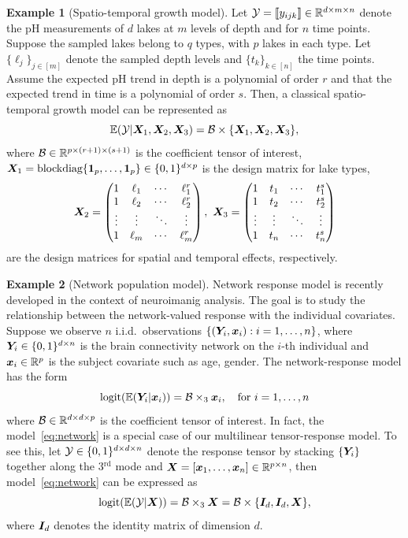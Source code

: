 \documentclass[twoside]{article}
\theoremstyle{plain}
\theoremstyle{definition}
\newtheorem{example}{Example}
\begin{document}
\begin{example}[Spatio-temporal growth model]
Let $\mathcal{Y}=\llbracket y_{ijk} \rrbracket\in\mathbb{R}^{d \times m\times n}$ denote the pH measurements of $d$ lakes at $m$ levels of depth and for $n$ time points. Suppose the sampled lakes belong to $q$ types, with $p$ lakes in each type. Let $\{\ell_j\}_{j\in[m]}$ denote the sampled depth levels and $\{t_k\}_{k\in[n]}$ the time points. Assume the expected pH trend in depth is a polynomial of order $r$ and that the expected trend in time is a polynomial of order $s$. Then, a classical spatio-temporal growth model can be represented as
\[
\mathbb{E}(\mathcal{Y}|\bm X_1,\bm X_2,\bm X_3)=\mathcal{B}\times\{\bm X_1,\bm X_2,\bm X_3\},
\]
where $\mathcal{B}\in\mathbb{R}^{p\times (r+1)\times (s+1)}$ is the coefficient tensor of interest, $\bm X_1=\text{blockdiag}\{\mathbf{1}_p,\ldots,\mathbf{1}_p\}\in \{0,1\}^{d\times p}$ is the design matrix for lake types, 
\[
\bm X_2=
\begin{pmatrix}
1 & \ell_1&\cdots &\ell^{r}_1\\
1 & \ell_2&\cdots &\ell^{r}_2\\
\vdots &\vdots&\ddots&\vdots\\
1&\ell_{m}&\cdots&\ell^{r}_{m}
\end{pmatrix},\
\bm X_3=
\begin{pmatrix}
1 & t_1&\cdots &t^{s}_1\\
1 & t_2&\cdots &t^{s}_2\\
\vdots &\vdots&\ddots&\vdots\\
1&t_{n}&\cdots&t^{s}_{n}
\end{pmatrix}
\]
are the design matrices for spatial and temporal effects, respectively. 
\end{example}
\begin{example}[Network population model] 
Network response model is recently developed in the context of neuroimanig analysis. The goal is to study the relationship between the network-valued response with the individual covariates. Suppose we observe $n$ i.i.d.\ observations $\{(\bm Y_i, \bm x_i): i=1,\ldots,n\}$, where $\bm Y_i\in\{0,1\}^{d\times n}$ is the brain connectivity network on the $i$-th individual and $\bm x_i\in\mathbb{R}^p$ is the subject covariate such as age, gender. The network-response model has the form
\begin{equation}\label{eq:network}
\text{logit}(\mathbb{E}(\bm Y_i|\bm x_i))=\mathcal{B}\times_3\bm x_i, \quad \text{for }i=1,\ldots,n
\end{equation}
where $\mathcal{B}\in \mathbb{R}^{d\times d\times p}$ is the coefficient tensor of interest. In fact, the model~\eqref{eq:network} is a special case of our multilinear tensor-response model. To see this, let $\mathcal{Y}\in\{0,1\}^{d\times d\times n}$ denote the response tensor by stacking $\{\bm Y_i\}$ together along the 3$^\text{rd}$ mode and $\bm X=[\bm x_1,\ldots,\bm x_n]\in\mathbb{R}^{p\times n}$, then model~\eqref{eq:network} can be expressed as 
\[
\text{logit}(\mathbb{E}(\mathcal{Y}|\bm X))=\mathcal{B}\times_3 \bm X=\mathcal{B}\times\{\bm I_d, \bm I_d, \bm X\},
\]
where $\bm I_d$ denotes the identity matrix of dimension $d$. 
 \end{example}
 
\end{document}
